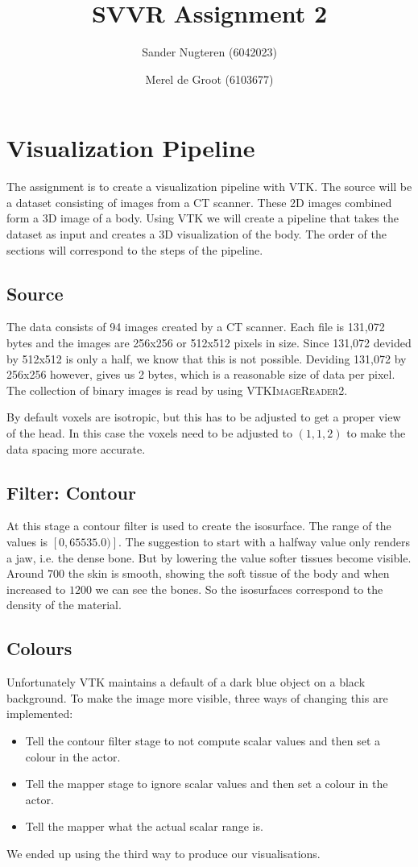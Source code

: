 \documentclass{article}
\begin{document}
\title{SVVR Assignment 2}
\author{Sander Nugteren (6042023) \and Merel de Groot (6103677)}
\renewcommand{\today}{November 17, 2014}
\maketitle

\section{Visualization Pipeline}
The assignment is to create a visualization pipeline with VTK. The source will be a dataset consisting of images from a CT scanner. These 2D images combined form a 3D image of a body. Using VTK we will create a pipeline that takes the dataset as input and creates a 3D visualization of the body. The order of the sections will correspond to the steps of the pipeline.

\subsection{Source}
The data consists of 94 images created by a CT scanner. Each file is 131,072 bytes and the images are 256x256 or 512x512 pixels in size. Since 131,072 devided by 512x512 is only a half, we know that this is not possible. Deviding 131,072 by 256x256 however, gives us 2 bytes, which is a reasonable size of data per pixel. The collection of binary images is read by using \textsc{VTKImageReader2}.

By default voxels are isotropic, but this has to be adjusted to get a proper view of the head. In this case the voxels need to be adjusted to $(1,1,2)$ to make the data spacing more accurate.

\subsection{Filter: Contour}
At this stage a contour filter is used to create the isosurface. The range of the values is $\left[ 0,  65535.0) \right]$. The suggestion to start with a halfway value only renders a jaw, i.e. the dense bone. But by lowering the value softer tissues become visible. Around $700$ the skin is smooth, showing the soft tissue of the body and when increased to $1200$ we can see the bones. So the isosurfaces correspond to the density of the material.

\subsection{Colours}
Unfortunately VTK maintains a default of a dark blue object on a black background. To make the image more visible, three ways of changing this are implemented:
\begin{itemize}
\item Tell the contour filter stage to not compute scalar values and then set a
	colour in the actor.
\item Tell the mapper stage to ignore scalar values and then set a colour in
	the actor.
\item Tell the mapper what the actual scalar range is.
\end{itemize}
We ended up using the third way to produce our visualisations.
\end{document}
